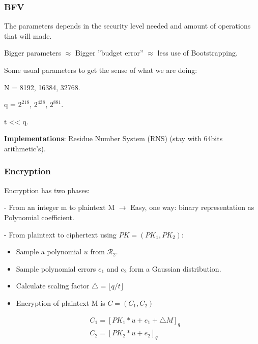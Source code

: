 \documentclass[10pt,handout]{beamer}
\begin{document}


\begin{frame}
\frametitle{BFV}

The parameters depends in the security level needed and amount of operations that will made.

Bigger parameters $\approx$ Bigger ''budget error'' $\approx$ less use of Bootstrapping.

Some usual parameters to get the sense of what we are doing:

N = 8192, 16384, 32768.

q = $2^{218}$,   $2^{438}$,  $2^{881}$.

t  << q.


    \textbf{Implementations}: Residue Number System (RNS) (stay with 64bits arithmetic's).

\end{frame}


\begin{frame}
\frametitle{Encryption}

Encryption has two phases:

 - From an integer m to plaintext M $\rightarrow$ Easy, one way: binary representation as Polynomial coefficient.

    - From plaintext to ciphertext using $PK = (PK_1, PK_2)$:

\begin{itemize}
    \item Sample a polynomial $u$ from $\mathcal{R}_2$.
    \item Sample polynomial errors $e_1$ and $e_2$ form a Gaussian distribution.
    \item Calculate scaling factor $\triangle = \lfloor q/t\rfloor $
    \item Encryption of plaintext M is $C=(C_1, C_2)$
\end{itemize}
\begin{align}
    &C_1 = [PK_1 * u + e_1 + \triangle M ]_q\nonumber \\
    &C_2 = [PK_2 * u + e_2]_q\nonumber
\end{align}


\end{frame}
\end{document}
